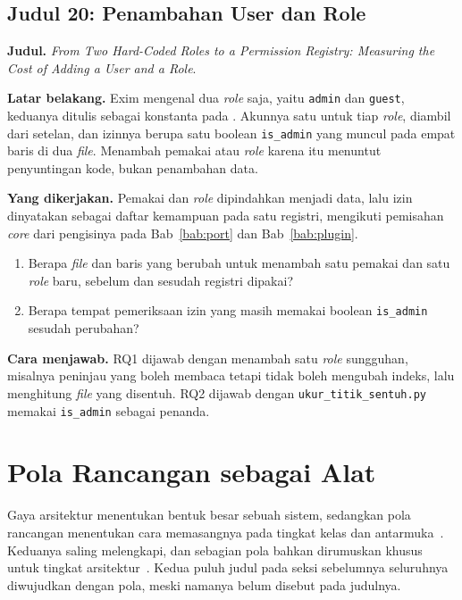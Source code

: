 \subsection*{Judul 20: Penambahan User dan Role}

\textbf{Judul.} \textit{From Two Hard-Coded Roles to a Permission Registry:
Measuring the Cost of Adding a User and a Role}.

\textbf{Latar belakang.} Exim mengenal dua \textit{role} saja, yaitu
\texttt{admin} dan \texttt{guest}, keduanya ditulis sebagai konstanta pada
. Akunnya satu untuk tiap \textit{role}, diambil
dari setelan, dan izinnya berupa satu boolean \texttt{is\_admin} yang muncul
pada empat baris di dua \textit{file}. Menambah pemakai atau \textit{role} karena itu
menuntut penyuntingan kode, bukan penambahan data.

\textbf{Yang dikerjakan.} Pemakai dan \textit{role} dipindahkan menjadi data,
lalu izin dinyatakan sebagai daftar kemampuan pada satu registri, mengikuti
pemisahan \textit{core} dari pengisinya pada
Bab~\ref{bab:port} dan
Bab~\ref{bab:plugin}.

\begin{enumerate}
  \item Berapa \textit{file} dan baris yang berubah untuk menambah satu pemakai dan
    satu \textit{role} baru, sebelum dan sesudah registri dipakai?
  \item Berapa tempat pemeriksaan izin yang masih memakai boolean
    \texttt{is\_admin} sesudah perubahan?
\end{enumerate}

\textbf{Cara menjawab.} RQ1 dijawab dengan menambah satu \textit{role}
sungguhan, misalnya peninjau yang boleh membaca tetapi tidak boleh mengubah
indeks, lalu menghitung \textit{file} yang disentuh. RQ2 dijawab dengan
\texttt{ukur\_titik\_sentuh.py} memakai \texttt{is\_admin} sebagai penanda.

\section{Pola Rancangan sebagai Alat}

Gaya arsitektur menentukan bentuk besar sebuah sistem, sedangkan pola
rancangan menentukan cara memasangnya pada tingkat kelas dan
antarmuka~\cite{gamma1994patterns}. Keduanya saling melengkapi, dan sebagian
pola bahkan dirumuskan khusus untuk tingkat arsitektur~\cite{buschmann1996posa}.
Kedua puluh judul pada seksi sebelumnya seluruhnya diwujudkan dengan pola,
meski namanya belum disebut pada judulnya.


